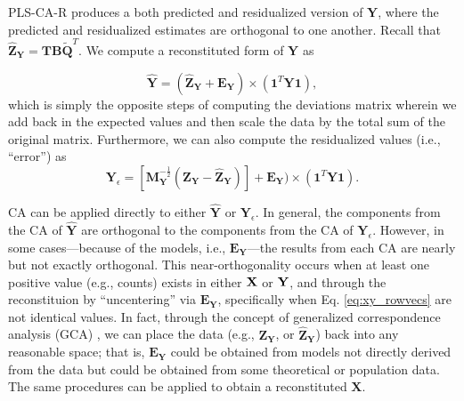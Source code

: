 \documentclass[12pt]{article}
\begin{document}
\label{section:recresp}

PLS-CA-R produces a both predicted and residualized version of
\({\mathbf Y}\), where the predicted and residualized estimates are
orthogonal to one another. Recall that
\(\widehat{{\mathbf Z}}_{\mathbf Y} = {\mathbf T} {\mathbf B}\widetilde{\mathbf Q}^{T}\).
We compute a reconstituted form of \({\mathbf Y}\) as

\begin{equation}
\widehat{\mathbf Y} = (\widehat{{\mathbf Z}}_{\mathbf Y} + {\mathbf E}_{\mathbf Y}) \times ({\mathbf 1}^{T}{\mathbf Y}{\mathbf 1}),
\label{eq:Yhat}
\end{equation} which is simply the opposite steps of computing the
deviations matrix wherein we add back in the expected values and then
scale the data by the total sum of the original matrix. Furthermore, we
can also compute the residualized values (i.e., ``error'') as
\begin{equation}
{\mathbf Y}_{\epsilon} = [ {\mathbf M}_{\mathbf Y}^{-\frac{1}{2}}({\mathbf Z}_{\mathbf Y} - \widehat{{\mathbf Z}}_{\mathbf Y})] + {\mathbf E}_{\mathbf Y}) \times ({\mathbf 1}^{T}{\mathbf Y}{\mathbf 1}).
\label{eq:Yresid}
\end{equation}

CA can be applied directly to either \(\widehat{\mathbf Y}\) or
\({\mathbf Y}_{\epsilon}\). In general, the components from the CA of
\(\widehat{\mathbf Y}\) are orthogonal to the components from the CA of
\({\mathbf Y}_{\epsilon}\). However, in some cases---because of the
models, i.e., \({\mathbf E}_{\mathbf Y}\)---the results from each CA are
nearly but not exactly orthogonal. This near-orthogonality occurs when
at least one positive value (e.g., counts) exists in either \({\bf X}\)
or \({\bf Y}\), and through the reconstituion by ``uncentering'' via
\({\mathbf E}_{\mathbf Y}\), specifically when Eq. \ref{eq:xy_rowvecs}
are not identical values. In fact, through the concept of generalized
correspondence analysis (GCA)
\citetext{\citealp{escofier1983analyse}; \citealp{escofier1984analyse}; \citealp[for
more details and background see also][]{beaton2018generalization}}, we
can place the data (e.g., \({\mathbf Z}_{\mathbf Y}\), or
\(\widehat{{\mathbf Z}}_{\mathbf Y}\)) back into any reasonable space;
that is, \({\mathbf E}_{\mathbf Y}\) could be obtained from models not
directly derived from the data but could be obtained from some
theoretical or population data. The same procedures can be applied to
obtain a reconstituted \({\mathbf X}\).
\end{document}
